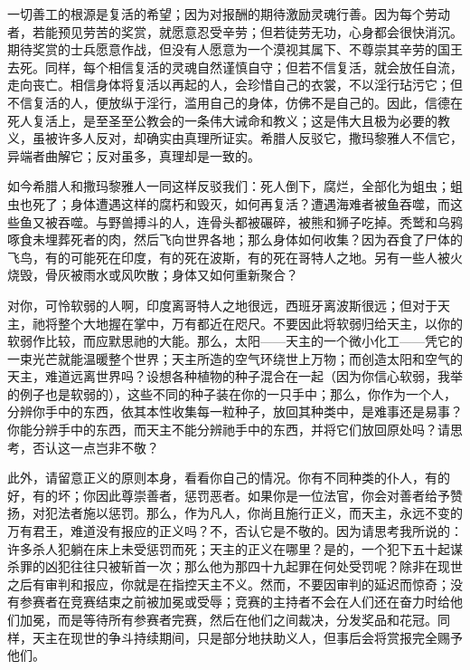 一切善工的根源是复活的希望；因为对报酬的期待激励灵魂行善。因为每个劳动者，若能预见劳苦的奖赏，就愿意忍受辛劳；但若徒劳无功，心身都会很快消沉。期待奖赏的士兵愿意作战，但没有人愿意为一个漠视其属下、不尊崇其辛劳的国王去死。同样，每个相信复活的灵魂自然谨慎自守；但若不信复活，就会放任自流，走向丧亡。相信身体将复活以再起的人，会珍惜自己的衣裳，不以淫行玷污它；但不信复活的人，便放纵于淫行，滥用自己的身体，仿佛不是自己的。因此，信德在死人复活上，是至圣至公教会的一条伟大诫命和教义；这是伟大且极为必要的教义，虽被许多人反对，却确实由真理所证实。希腊人反驳它，撒玛黎雅人不信它，异端者曲解它；反对虽多，真理却是一致的。\par

如今希腊人和撒玛黎雅人一同这样反驳我们：死人倒下，腐烂，全部化为蛆虫；蛆虫也死了；身体遭遇这样的腐朽和毁灭，如何再复活？遭遇海难者被鱼吞噬，而这些鱼又被吞噬。与野兽搏斗的人，连骨头都被碾碎，被熊和狮子吃掉。秃鹫和乌鸦啄食未埋葬死者的肉，然后飞向世界各地；那么身体如何收集？因为吞食了尸体的飞鸟，有的可能死在印度，有的死在波斯，有的死在哥特人之地。另有一些人被火烧毁，骨灰被雨水或风吹散；身体又如何重新聚合？\par

对你，可怜软弱的人啊，印度离哥特人之地很远，西班牙离波斯很远；但对于天主，祂将整个大地握在掌中，万有都近在咫尺。不要因此将软弱归给天主，以你的软弱作比较，而应默思祂的大能。那么，太阳——天主的一个微小化工——凭它的一束光芒就能温暖整个世界；天主所造的空气环绕世上万物；而创造太阳和空气的天主，难道远离世界吗？设想各种植物的种子混合在一起（因为你信心软弱，我举的例子也是软弱的），这些不同的种子装在你的一只手中；那么，你作为一个人，分辨你手中的东西，依其本性收集每一粒种子，放回其种类中，是难事还是易事？你能分辨手中的东西，而天主不能分辨祂手中的东西，并将它们放回原处吗？请思考，否认这一点岂非不敬？\par

此外，请留意正义的原则本身，看看你自己的情况。你有不同种类的仆人，有的好，有的坏；你因此尊崇善者，惩罚恶者。如果你是一位法官，你会对善者给予赞扬，对犯法者施以惩罚。那么，作为凡人，你尚且施行正义，而天主，永远不变的万有君王，难道没有报应的正义吗？不，否认它是不敬的。因为请思考我所说的：许多杀人犯躺在床上未受惩罚而死；天主的正义在哪里？是的，一个犯下五十起谋杀罪的凶犯往往只被斩首一次；那么他为那四十九起罪在何处受罚呢？除非在现世之后有审判和报应，你就是在指控天主不义。然而，不要因审判的延迟而惊奇；没有参赛者在竞赛结束之前被加冕或受辱；竞赛的主持者不会在人们还在奋力时给他们加冕，而是等待所有参赛者完赛，然后在他们之间裁决，分发奖品和花冠。同样，天主在现世的争斗持续期间，只是部分地扶助义人，但事后会将赏报完全赐予他们。\par


